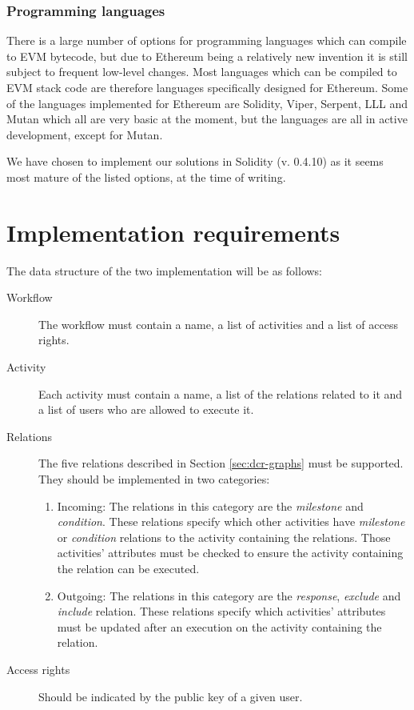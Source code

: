 \documentclass{article}
\begin{document}
		\subsubsection{Programming languages}
		There is a large number of options for programming languages which can compile to EVM bytecode, but due to Ethereum being a relatively new invention it is still subject to frequent low-level changes. 
		Most languages which can be compiled to EVM stack code are therefore languages specifically designed for Ethereum.
		Some of the languages implemented for Ethereum are Solidity, Viper, Serpent, LLL and Mutan which all are very basic at the moment, but the languages are all in active development, except for Mutan.

		We have chosen to implement our solutions in Solidity (v. 0.4.10) as it seems most mature of the listed options, at the time of writing.

	\section{Implementation requirements}
	\label{sec:implementation-requirements}
	The data structure of the two implementation will be as follows:

	\begin{description}
		\item[Workflow] The workflow must contain a name, a list of activities and a list of access rights.
		\item[Activity] Each activity must contain a name, a list of the relations related to it and a list of users who are allowed to execute it.
		\item[Relations] The five relations described in Section \ref{sec:dcr-graphs} must be supported. They should be implemented in two categories:
			\begin{enumerate}
				\item Incoming: The relations in this category are the \emph{milestone} and \emph{condition}. These relations specify which other activities have \emph{milestone} or \emph{condition} relations to the activity containing the relations. Those activities' attributes must be checked to ensure the activity containing the relation can be executed.
				\item Outgoing: The relations in this category are the \emph{response}, \emph{exclude} and \emph{include} relation. These relations specify which activities' attributes must be updated after an execution on the activity containing the relation. 
			\end{enumerate}
		\item[Access rights] Should be indicated by the public key of a given user.
	\end{description}
\end{document}
